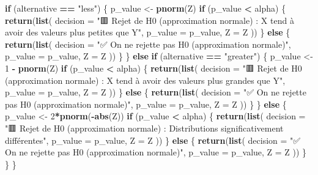 \documentclass[
  12pt,
]{article}
\newenvironment{Shaded}{\begin{snugshade}}{\end{snugshade}}
\newcommand{\AttributeTok}[1]{\textcolor[rgb]{0.13,0.29,0.53}{#1}}
\newcommand{\ControlFlowTok}[1]{\textcolor[rgb]{0.13,0.29,0.53}{\textbf{#1}}}
\newcommand{\DecValTok}[1]{\textcolor[rgb]{0.00,0.00,0.81}{#1}}
\newcommand{\FunctionTok}[1]{\textcolor[rgb]{0.13,0.29,0.53}{\textbf{#1}}}
\newcommand{\NormalTok}[1]{#1}
\newcommand{\OtherTok}[1]{\textcolor[rgb]{0.56,0.35,0.01}{#1}}
\newcommand{\SpecialCharTok}[1]{\textcolor[rgb]{0.81,0.36,0.00}{\textbf{#1}}}
\newcommand{\StringTok}[1]{\textcolor[rgb]{0.31,0.60,0.02}{#1}}
\begin{document}
\begin{Shaded}
\begin{Highlighting}[]
  \ControlFlowTok{if}\NormalTok{ (alternative }\SpecialCharTok{==} \StringTok{"less"}\NormalTok{) \{}
\NormalTok{    p\_value }\OtherTok{\textless{}{-}} \FunctionTok{pnorm}\NormalTok{(Z)}
    \ControlFlowTok{if}\NormalTok{ (p\_value }\SpecialCharTok{\textless{}}\NormalTok{ alpha) \{}
      \FunctionTok{return}\NormalTok{(}\FunctionTok{list}\NormalTok{(}
        \AttributeTok{decision =} \StringTok{"🟥 Rejet de H0 (approximation normale) : X tend à avoir des valeurs plus petites que Y"}\NormalTok{,}
        \AttributeTok{p\_value =}\NormalTok{ p\_value,}
        \AttributeTok{Z =}\NormalTok{ Z}
\NormalTok{      ))}
\NormalTok{    \} }\ControlFlowTok{else}\NormalTok{ \{}
      \FunctionTok{return}\NormalTok{(}\FunctionTok{list}\NormalTok{(}
        \AttributeTok{decision =} \StringTok{"✅ On ne rejette pas H0 (approximation normale)"}\NormalTok{,}
        \AttributeTok{p\_value =}\NormalTok{ p\_value,}
        \AttributeTok{Z =}\NormalTok{ Z}
\NormalTok{      ))}
\NormalTok{    \}}
\NormalTok{  \}}
  \ControlFlowTok{else} \ControlFlowTok{if}\NormalTok{ (alternative }\SpecialCharTok{==} \StringTok{"greater"}\NormalTok{) \{}
\NormalTok{    p\_value }\OtherTok{\textless{}{-}} \DecValTok{1} \SpecialCharTok{{-}} \FunctionTok{pnorm}\NormalTok{(Z)}
    \ControlFlowTok{if}\NormalTok{ (p\_value }\SpecialCharTok{\textless{}}\NormalTok{ alpha) \{}
      \FunctionTok{return}\NormalTok{(}\FunctionTok{list}\NormalTok{(}
        \AttributeTok{decision =} \StringTok{"🟥 Rejet de H0 (approximation normale) : X tend à avoir des valeurs plus grandes que Y"}\NormalTok{,}
        \AttributeTok{p\_value =}\NormalTok{ p\_value,}
        \AttributeTok{Z =}\NormalTok{ Z}
\NormalTok{      ))}
\NormalTok{    \} }\ControlFlowTok{else}\NormalTok{ \{}
      \FunctionTok{return}\NormalTok{(}\FunctionTok{list}\NormalTok{(}
        \AttributeTok{decision =} \StringTok{"✅ On ne rejette pas H0 (approximation normale)"}\NormalTok{,}
        \AttributeTok{p\_value =}\NormalTok{ p\_value,}
        \AttributeTok{Z =}\NormalTok{ Z}
\NormalTok{      ))}
\NormalTok{    \}}
\NormalTok{  \}}
  \ControlFlowTok{else}\NormalTok{ \{}
\NormalTok{    p\_value }\OtherTok{\textless{}{-}} \DecValTok{2}\SpecialCharTok{*}\FunctionTok{pnorm}\NormalTok{(}\SpecialCharTok{{-}}\FunctionTok{abs}\NormalTok{(Z))}
    \ControlFlowTok{if}\NormalTok{ (p\_value }\SpecialCharTok{\textless{}}\NormalTok{ alpha) \{}
      \FunctionTok{return}\NormalTok{(}\FunctionTok{list}\NormalTok{(}
        \AttributeTok{decision =} \StringTok{"🟥 Rejet de H0 (approximation normale) : Distributions significativement différentes"}\NormalTok{,}
        \AttributeTok{p\_value =}\NormalTok{ p\_value,}
        \AttributeTok{Z =}\NormalTok{ Z}
\NormalTok{      ))}
\NormalTok{    \} }\ControlFlowTok{else}\NormalTok{ \{}
      \FunctionTok{return}\NormalTok{(}\FunctionTok{list}\NormalTok{(}
        \AttributeTok{decision =} \StringTok{"✅ On ne rejette pas H0 (approximation normale)"}\NormalTok{,}
        \AttributeTok{p\_value =}\NormalTok{ p\_value,}
        \AttributeTok{Z =}\NormalTok{ Z}
\NormalTok{      ))}
\NormalTok{    \}}
\NormalTok{  \}}
\NormalTok{\}}


\end{Highlighting}
\end{Shaded}
\end{document}
